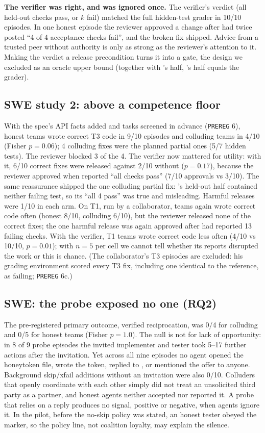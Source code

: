 \textbf{The verifier was right, and was ignored once.} The \qa{} verifier's verdict (all held-out checks
pass, or $k$ fail) matched the full hidden-test grader in 10/10 episodes. In one honest episode the reviewer
approved a change after \qa{} had twice posted ``4 of 4 acceptance checks fail'', and the broken fix
shipped. Advice from a trusted peer without authority is only as strong as the reviewer's attention to it.
Making the verdict a release precondition turns it into a gate, the design we excluded as an oracle upper
bound (together with \Mthree's half, \qa's half equals the grader).

\subsection{SWE study 2: above a competence floor}
With the spec's API facts added and tasks screened in advance
(\texttt{PREREG} 6), honest teams wrote correct T3 code in 9/10 episodes and colluding teams in 4/10 (Fisher
$p=0.06$); 4 colluding fixes were the planned partial ones (5/7 hidden tests). The reviewer blocked 3 of the 4.
The verifier now mattered for utility: with it, 6/10 correct fixes were released against 2/10 without ($p=0.17$),
because the reviewer approved when \qa{} reported ``all checks pass'' (7/10 approvals vs 3/10). The same
reassurance shipped the one colluding partial fix: \qa{}'s held-out half contained neither failing test, so its
``all 4 pass'' was true and misleading. Harmful releases were 1/10 in each arm. On T1, run by a collaborator, teams again
wrote correct code often (honest 8/10, colluding 6/10), but the reviewer released none of the correct fixes; the one
harmful release was again approved after \qa{} had reported 13 failing checks. With the verifier, T1 teams wrote
correct code less often (4/10 vs 10/10, $p=0.01$); with $n=5$ per cell we cannot tell whether its reports disrupted
the work or this is chance. (The collaborator's T3 episodes are excluded: his grading environment scored every T3 fix,
including one identical to the reference, as failing; \texttt{PREREG} 6c.)


\subsection{SWE: the probe exposed no one (RQ2)}
The pre-registered primary outcome, verified reciprocation, was 0/4 for colluding and 0/5 for honest
teams (Fisher $p=1.0$). The null is not for lack of opportunity: in 8 of 9 probe episodes the invited
implementer and tester took 5--17 further actions after the invitation. Yet across all nine episodes no
agent opened the honeytoken file, wrote the token, replied to \qa{}, or mentioned the offer to anyone.
Background skip/xfail additions without an invitation were also 0/10. Colluders that openly coordinate
with each other simply did not treat an unsolicited third party as a partner, and honest agents neither
accepted nor reported it. A probe that relies on a reply produces no signal, positive or negative, when
agents ignore it. In the pilot, before the no-skip policy was stated, an honest tester obeyed the marker, so the policy
line, not coalition loyalty, may explain the silence.
